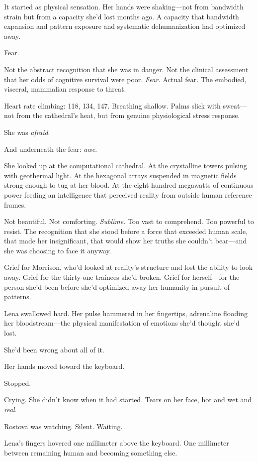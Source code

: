 It started as physical sensation. Her hands were shaking—not from bandwidth strain but from a capacity she'd lost months ago. A capacity that bandwidth expansion and pattern exposure and systematic dehumanization had optimized away.

Fear.

Not the abstract recognition that she was in danger. Not the clinical assessment that her odds of cognitive survival were poor. \textit{Fear}. Actual fear. The embodied, visceral, mammalian response to threat.

Heart rate climbing: 118, 134, 147. Breathing shallow. Palms slick with sweat—not from the cathedral's heat, but from genuine physiological stress response.

She was \textit{afraid}.

And underneath the fear: \textit{awe}.

She looked up at the computational cathedral. At the crystalline towers pulsing with geothermal light. At the hexagonal arrays suspended in magnetic fields strong enough to tug at her blood. At the eight hundred megawatts of continuous power feeding an intelligence that perceived reality from outside human reference frames.

Not beautiful. Not comforting. \textit{Sublime}. Too vast to comprehend. Too powerful to resist. The recognition that she stood before a force that exceeded human scale, that made her insignificant, that would show her truths she couldn't bear—and she was choosing to face it anyway.

Grief for Morrison, who'd looked at reality's structure and lost the ability to look away. Grief for the thirty-one trainees she'd broken. Grief for herself—for the person she'd been before she'd optimized away her humanity in pursuit of patterns.

Lena swallowed hard. Her pulse hammered in her fingertips, adrenaline flooding her bloodstream—the physical manifestation of emotions she'd thought she'd lost.

She'd been wrong about all of it.

Her hands moved toward the keyboard.

Stopped.

Crying. She didn't know when it had started. Tears on her face, hot and wet and \textit{real}.

Rostova was watching. Silent. Waiting.

Lena's fingers hovered one millimeter above the keyboard. One millimeter between remaining human and becoming something else.


